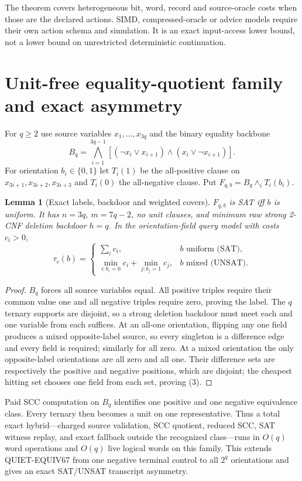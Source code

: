 \documentclass[11pt]{article}
\newtheorem{lemma}{Lemma}
\begin{document}
The theorem covers heterogeneous bit, word, record and source-oracle costs
when those are the declared actions.  SIMD, compressed-oracle or advice models
require their own action schema and simulation.  It is an exact input-access
lower bound, not a lower bound on unrestricted deterministic continuation.

\section{Unit-free equality-quotient family and exact asymmetry}
For $q\ge2$ use source variables $x_1,\ldots,x_{3q}$ and the binary equality
backbone
\[
B_q=\bigwedge_{i=1}^{3q-1}
[(\neg x_i\vee x_{i+1})\wedge(x_i\vee\neg x_{i+1})].
\]
For orientation $b_i\in\{0,1\}$ let $T_i(1)$ be the all-positive clause on
$x_{3i+1},x_{3i+2},x_{3i+3}$ and $T_i(0)$ the all-negative clause.  Put
$F_{q,b}=B_q\wedge_iT_i(b_i)$.

\begin{lemma}[Exact labels, backdoor and weighted covers]
$F_{q,b}$ is SAT iff $b$ is uniform.  It has $n=3q$, $m=7q-2$, no unit
clauses, and minimum raw strong 2-CNF deletion backdoor $h=q$.  In the
orientation-field query model with costs $c_i>0$,
\[
\tau_c(b)=
\begin{cases}
\sum_i c_i,&b\text{ uniform (SAT)},\\
\min_{i:b_i=0}c_i+\min_{j:b_j=1}c_j,&b\text{ mixed (UNSAT)}.
\end{cases}                                                     \tag{3}
\]
\end{lemma}
\begin{proof}
$B_q$ forces all source variables equal.  All positive triples require their
common value one and all negative triples require zero, proving the label.
The $q$ ternary supports are disjoint, so a strong deletion backdoor must meet
each and one variable from each suffices.  At an all-one orientation, flipping
any one field produces a mixed opposite-label source, so every singleton is a
difference edge and every field is required; similarly for all zero.  At a
mixed orientation the only opposite-label orientations are all zero and all
one.  Their difference sets are respectively the positive and negative
positions, which are disjoint; the cheapest hitting set chooses one field from
each set, proving (3).
\end{proof}

Paid SCC computation on $B_q$ identifies one positive and one negative
equivalence class.  Every ternary then becomes a unit on one representative.
Thus a total exact hybrid---charged source validation, SCC quotient, reduced
SCC, SAT witness replay, and exact fallback outside the recognized class---runs
in $O(q)$ word operations and $O(q)$ live logical words on this family.  This
extends QUIET-EQUIV67 from one negative terminal control to all $2^q$
orientations and gives an exact SAT/UNSAT transcript asymmetry.
\end{document}
